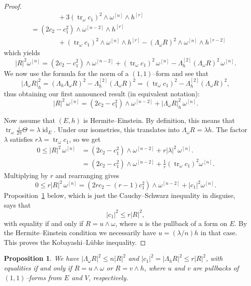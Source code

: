 \documentclass[11pt,a4paper]{amsart}
\def\^#1{^{[#1]}}
\DeclareMathOperator{\tr}{tr}
\DeclareMathOperator{\id}{id}
\def\curv{\frac{i}{2\pi} \Theta}
\newtheorem{prop}[theo]{Proposition}
\theoremstyle{definition}
\theoremstyle{remark}
\numberwithin{equation}{section}
\begin{document}
\begin{proof}
\begin{align*}
    &\qquad\qquad
    {}+ 3 (\tr_\omega c_1)^2 \wedge \omega\^{n} \wedge h\^{r}
    \\
    &= (2 c_2 - c_1^2) \wedge \omega\^{n-2} \wedge h\^{r} 
    \\
    &\qquad\qquad
    + (\tr_\omega c_1)^2 \wedge \omega\^{n} \wedge h\^{r}
    - (\Lambda_\omega R)^2 \wedge \omega\^{n} \wedge h\^{r-2}
\end{align*}
which yields
$$
    \lvert R \rvert^2 \omega\^{n}
    = (2 c_2 - c_1^2) \wedge \omega\^{n-2}
    + (\tr_\omega c_1)^2 \, \omega\^{n}
    - \Lambda\^{2}_h(\Lambda_\omega R)^2 \, \omega\^{n}.
$$
We now use the formula for the norm of a $(1,1)$--form and see that
$$
\lvert \Lambda_\omega R \rvert_h^2
= (\Lambda_h\Lambda_\omega R)^2 - \Lambda\^{2}_h(\Lambda_\omega R)^2
= (\tr_\omega c_1)^2 - \Lambda\^{2}_h(\Lambda_\omega R)^2,
$$
thus obtaining our first announced result (in equivalent notation):
$$
    \lvert R \rvert^2 \, \omega\^{n}
    = (2 c_2 - c_1^2) \wedge \omega\^{n-2}
    + \lvert \Lambda_\omega R \rvert_h^2 \, \omega\^{n}.
$$

Now assume that $(E,h)$ is Hermite--Einstein. By definition, this means
that $\tr_\omega \curv = \lambda \id_{E}$. Under our isometries, this
translates into $\Lambda_\omega R = \lambda h$. The factor $\lambda$
satisfies $r \lambda = \tr_\omega c_1$, so we get
\begin{align*}
    0 \leq 
    \lvert R \rvert^2 \, \omega\^{n}
    &= (2 c_2 - c_1^2) \wedge \omega\^{n-2}
    + r |\lambda|^2 \, \omega\^{n}.
    \\
    &= (2 c_2 - c_1^2) \wedge \omega\^{n-2}
    + \tfrac 1r (\tr_\omega c_1)^2 \omega\^{n}.
\end{align*}
Multiplying by $r$ and rearranging gives 
$$
0 \leq
r \lvert R \rvert^2 \, \omega\^{n}
= (2r c_2 - (r-1)c_1^2) \wedge \omega\^{n-2}
+ \lvert c_1 \rvert^2 \omega\^{n}.
$$
Proposition~\ref{prop:CS} below, which is just the Cauchy--Schwarz
inequality in disguise, says that
$$
\lvert c_1 \rvert^2 \leq r \lvert R \rvert^2,
$$
with equality if and only if $R = u \wedge \omega$, where $u$ is the
pullback of a form on $E$. By the Hermite--Einstein condition we
necessarily have $u = (\lambda/n) h$ in that case. This proves the
Kobayashi--L\"{u}bke inequality.
\end{proof}



\begin{prop}
\label{prop:CS}
We have $\lvert \Lambda_\omega R\rvert^2 \leq n \lvert R \rvert^2$ and
$\lvert c_1 \rvert^2 = \lvert \Lambda_h R\rvert^2 \leq r \lvert R
\rvert^2$, with equalities if and only if $R = u \wedge \omega$ or $R = v
\wedge h$, where $u$ and $v$ are pullbacks of $(1,1)$--forms from $E$ and
$V$, respectively. 
\end{prop}
\end{document}
